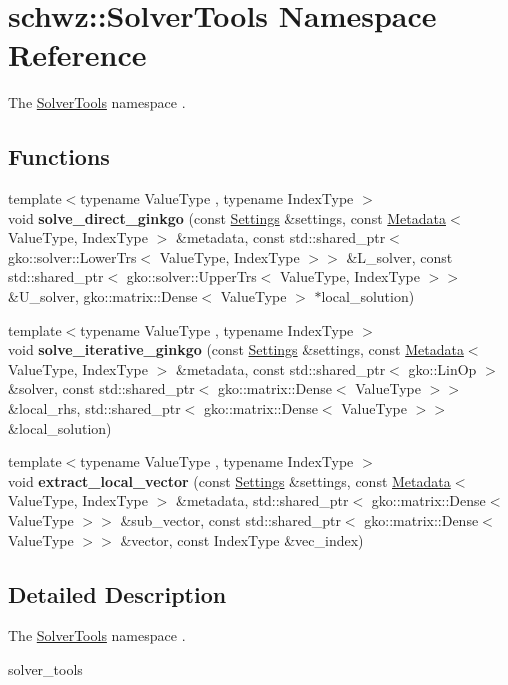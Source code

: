 \hypertarget{namespaceschwz_1_1SolverTools}{}\section{schwz\+:\+:Solver\+Tools Namespace Reference}
\label{namespaceschwz_1_1SolverTools}


The \hyperlink{namespaceschwz_1_1SolverTools}{Solver\+Tools} namespace .  


\subsection*{Functions}
\begin{DoxyCompactItemize}
\item 
\mbox{\label{namespaceschwz_1_1SolverTools_aa0dfc9506e3813443c3923bceb608b97}} 
{\footnotesize template$<$typename Value\+Type , typename Index\+Type $>$ }\\void {\bfseries solve\+\_\+direct\+\_\+ginkgo} (const \hyperlink{structschwz_1_1Settings}{Settings} \&settings, const \hyperlink{structschwz_1_1Metadata}{Metadata}$<$ Value\+Type, Index\+Type $>$ \&metadata, const std\+::shared\+\_\+ptr$<$ gko\+::solver\+::\+Lower\+Trs$<$ Value\+Type, Index\+Type $>$$>$ \&L\+\_\+solver, const std\+::shared\+\_\+ptr$<$ gko\+::solver\+::\+Upper\+Trs$<$ Value\+Type, Index\+Type $>$$>$ \&U\+\_\+solver, gko\+::matrix\+::\+Dense$<$ Value\+Type $>$ $\ast$local\+\_\+solution)
\item 
\mbox{\label{namespaceschwz_1_1SolverTools_a246fa524f65b66c548ecd16a74124356}} 
{\footnotesize template$<$typename Value\+Type , typename Index\+Type $>$ }\\void {\bfseries solve\+\_\+iterative\+\_\+ginkgo} (const \hyperlink{structschwz_1_1Settings}{Settings} \&settings, const \hyperlink{structschwz_1_1Metadata}{Metadata}$<$ Value\+Type, Index\+Type $>$ \&metadata, const std\+::shared\+\_\+ptr$<$ gko\+::\+Lin\+Op $>$ \&solver, const std\+::shared\+\_\+ptr$<$ gko\+::matrix\+::\+Dense$<$ Value\+Type $>$$>$ \&local\+\_\+rhs, std\+::shared\+\_\+ptr$<$ gko\+::matrix\+::\+Dense$<$ Value\+Type $>$$>$ \&local\+\_\+solution)
\item 
\mbox{\label{namespaceschwz_1_1SolverTools_a3537014bf1cbd8e0b1c3895a2aaac891}} 
{\footnotesize template$<$typename Value\+Type , typename Index\+Type $>$ }\\void {\bfseries extract\+\_\+local\+\_\+vector} (const \hyperlink{structschwz_1_1Settings}{Settings} \&settings, const \hyperlink{structschwz_1_1Metadata}{Metadata}$<$ Value\+Type, Index\+Type $>$ \&metadata, std\+::shared\+\_\+ptr$<$ gko\+::matrix\+::\+Dense$<$ Value\+Type $>$$>$ \&sub\+\_\+vector, const std\+::shared\+\_\+ptr$<$ gko\+::matrix\+::\+Dense$<$ Value\+Type $>$$>$ \&vector, const Index\+Type \&vec\+\_\+index)
\end{DoxyCompactItemize}


\subsection{Detailed Description}
The \hyperlink{namespaceschwz_1_1SolverTools}{Solver\+Tools} namespace . 

solver\+\_\+tools 